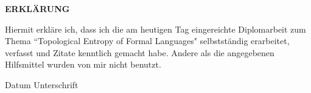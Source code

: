 

{
\thispagestyle{empty}

\LARGE \textbf{ERKLÄRUNG}

\bigskip \medskip

\Large

Hiermit erkläre ich, dass ich die am heutigen Tag eingereichte
Diplomarbeit zum Thema
``Topological Entropy of Formal Languages"
selbstständig
erarbeitet, verfasst und Zitate kenntlich gemacht habe. Andere als
die angegebenen Hilfsmittel wurden von mir nicht benutzt.

\bigskip \bigskip \bigskip \bigskip \bigskip




Datum \hfill Unterschrift

\normalsize

\bigskip \bigskip \bigskip

}